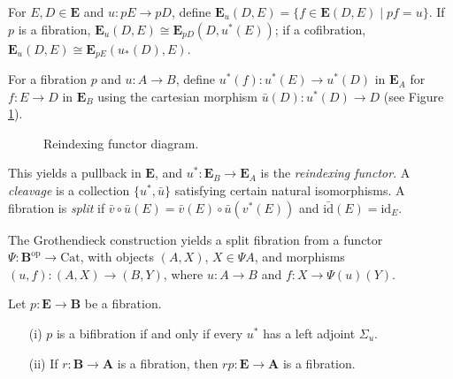 \documentclass{article}
\begin{document}
For $E, D \in \mathbf{E}$ and $u : p E \to p D$, define $\mathbf{E}_u(D, E) = \{ f \in \mathbf{E}(D, E) \mid p f = u \}$. If $p$ is a fibration, $\mathbf{E}_u(D, E) \cong \mathbf{E}_{p D}(D, u^*(E))$; if a cofibration, $\mathbf{E}_u(D, E) \cong \mathbf{E}_{p E}(u_*(D), E)$.

For a fibration $p$ and $u : A \to B$, define $u^*(f) : u^*(E) \to u^*(D)$ in $\mathbf{E}_A$ for $f : E \to D$ in $\mathbf{E}_B$ using the cartesian morphism $\bar{u}(D) : u^*(D) \to D$ (see Figure \ref{fig:reindexing}).
\begin{figure}[h]
    \centering
    \caption{Reindexing functor diagram.}
    \label{fig:reindexing}
\end{figure}
This yields a pullback in $\mathbf{E}$, and $u^* : \mathbf{E}_B \to \mathbf{E}_A$ is the \emph{reindexing functor}. A \emph{cleavage} is a collection $\{ u^*, \bar{u} \}$ satisfying certain natural isomorphisms. A fibration is \emph{split} if $\bar{v} \circ \bar{u}(E) = \bar{v}(E) \circ \bar{u}(v^*(E))$ and $\bar{\text{id}}(E) = \text{id}_E$.

The Grothendieck construction yields a split fibration from a functor $\Psi : \mathbf{B}^{\text{op}} \to \text{Cat}$, with objects $(A, X)$, $X \in \Psi A$, and morphisms $(u, f) : (A, X) \to (B, Y)$, where $u : A \to B$ and $f : X \to \Psi(u)(Y)$.

\begin{proposition}
\label{prop:2.3}
Let $p : \mathbf{E} \to \mathbf{B}$ be a fibration.
\begin{enumerate}
    \item[(i)] $p$ is a bifibration if and only if every $u^*$ has a left adjoint $\Sigma_u$.
    \item[(ii)] If $r : \mathbf{B} \to \mathbf{A}$ is a fibration, then $r p : \mathbf{E} \to \mathbf{A}$ is a fibration.
\end{enumerate}
\end{proposition}
\end{document}
